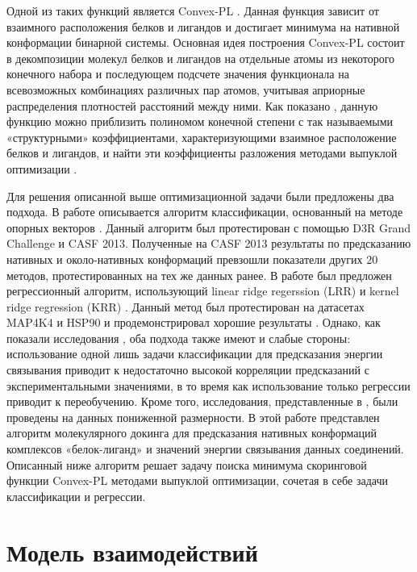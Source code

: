 \documentclass[preprint,12pt,3p]{elsarticle}
\begin{document}
Одной из таких функций является Convex-PL \cite{classification}. Данная функция зависит от взаимного расположения белков и лигандов и достигает минимума на нативной конформации бинарной системы. Основная идея построения Convex-PL состоит в декомпозиции молекул белков и лигандов на отдельные атомы из некоторого конечного набора и последующем подсчете значения функционала на всевозможных комбинациях различных пар атомов, учитывая априорные распределения плотностей расстояний между ними. Как показано \cite{classification}, данную функцию можно приблизить полиномом конечной степени с так называемыми «структурными» коэффициентами, характеризующими взаимное расположение белков и лигандов, и найти эти коэффициенты разложения методами выпуклой оптимизации \cite{convex_optimization}.

Для решения описанной выше оптимизационной задачи были предложены два подхода. В работе \cite{classification} описывается алгоритм классификации, основанный на методе опорных векторов \cite{vapnik}. Данный алгоритм был протестирован с помощью D3R Grand Challenge \cite{D3R} и CASF 2013. Полученные на CASF 2013 результаты по предсказанию нативных и около-нативных конформаций превзошли показатели других 20 методов, протестированных на тех же данных ранее. В работе \cite{regression} был предложен регрессионный алгоритм, использующий linear ridge regerssion (LRR) и kernel ridge regression (KRR) \cite{KRR1, KRR2, KRR3}. Данный метод был протестирован на датасетах MAP4K4 и HSP90 и продемонстрировал хорошие результаты \cite{regression}. Однако, как показали исследования \cite{classification, regression}, оба подхода также имеют и слабые стороны: использование одной лишь задачи классификации для предсказания энергии связывания приводит к недостаточно высокой корреляции предсказаний с экспериментальными значениями, в то время как использование только регрессии приводит к переобучению. Кроме того, исследования, представленные в \cite{classification, regression}, были проведены на данных пониженной размерности. 
В этой работе представлен алгоритм молекулярного докинга для предсказания нативных конформаций комплексов «белок-лиганд» и значений энергии связывания данных соединений. Описанный ниже алгоритм решает задачу поиска минимума скоринговой функции Convex-PL методами выпуклой оптимизации, сочетая в себе задачи классификации и регрессии.

\section{Модель взаимодействий}
\end{document}

